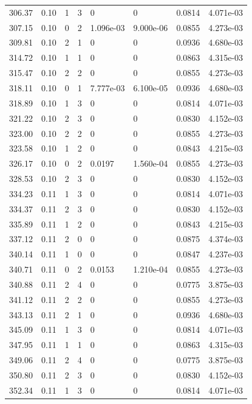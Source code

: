 \documentclass[preview]{standalone}
\begin{document}
{{{{\begin{tabular}{L{1.2cm}C{1.2cm} C{0.3cm}C{0.5cm} C{1.4cm}C{1.4cm} C{1.4cm}C{1.4cm}}
  306.37  &  0.10  & 1     &  3 &  0  & 0  & 0.0814 &  4.071e-03   \\ 
  307.15  &  0.10  & 0     &  2 &  1.096e-03  & 9.000e-06  & 0.0855 &  4.273e-03   \\ 
  309.81  &  0.10  & 2     &  1 &  0  & 0  & 0.0936 &  4.680e-03   \\ 
  314.72  &  0.10  & 1     &  1 &  0  & 0  & 0.0863 &  4.315e-03   \\ 
  315.47  &  0.10  & 2     &  2 &  0  & 0  & 0.0855 &  4.273e-03   \\ 
  318.11  &  0.10  & 0     &  1 &  7.777e-03  & 6.100e-05  & 0.0936 &  4.680e-03   \\ 
  318.89  &  0.10  & 1     &  3 &  0  & 0  & 0.0814 &  4.071e-03   \\ 
  321.22  &  0.10  & 2     &  3 &  0  & 0  & 0.0830 &  4.152e-03   \\ 
  323.00  &  0.10  & 2     &  2 &  0  & 0  & 0.0855 &  4.273e-03   \\ 
  323.58  &  0.10  & 1     &  2 &  0  & 0  & 0.0843 &  4.215e-03   \\ 
  326.17  &  0.10  & 0     &  2 &  0.0197  & 1.560e-04  & 0.0855 &  4.273e-03   \\ 
  328.53  &  0.10  & 2     &  3 &  0  & 0  & 0.0830 &  4.152e-03   \\ 
  334.23  &  0.11  & 1     &  3 &  0  & 0  & 0.0814 &  4.071e-03   \\ 
  334.37  &  0.11  & 2     &  3 &  0  & 0  & 0.0830 &  4.152e-03   \\ 
  335.89  &  0.11  & 1     &  2 &  0  & 0  & 0.0843 &  4.215e-03   \\ 
  337.12  &  0.11  & 2     &  0 &  0  & 0  & 0.0875 &  4.374e-03   \\ 
  340.14  &  0.11  & 1     &  0 &  0  & 0  & 0.0847 &  4.237e-03   \\ 
  340.71  &  0.11  & 0     &  2 &  0.0153  & 1.210e-04  & 0.0855 &  4.273e-03   \\ 
  340.88  &  0.11  & 2     &  4 &  0  & 0  & 0.0775 &  3.875e-03   \\ 
  341.12  &  0.11  & 2     &  2 &  0  & 0  & 0.0855 &  4.273e-03   \\ 
  343.13  &  0.11  & 2     &  1 &  0  & 0  & 0.0936 &  4.680e-03   \\ 
  345.09  &  0.11  & 1     &  3 &  0  & 0  & 0.0814 &  4.071e-03   \\ 
  347.95  &  0.11  & 1     &  1 &  0  & 0  & 0.0863 &  4.315e-03   \\ 
  349.06  &  0.11  & 2     &  4 &  0  & 0  & 0.0775 &  3.875e-03   \\ 
  350.80  &  0.11  & 2     &  3 &  0  & 0  & 0.0830 &  4.152e-03   \\ 
  352.34  &  0.11  & 1     &  3 &  0  & 0  & 0.0814 &  4.071e-03   \\ 
\hline 
\end{tabular} 

}}}}
\end{document}
